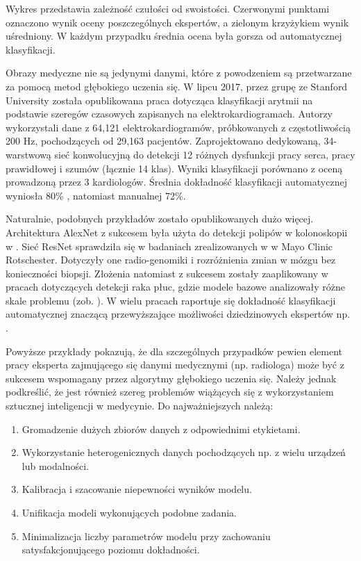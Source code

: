 Wykres przedstawia zależność czułości od swoistości. Czerwonymi punktami oznaczono wynik oceny poszczególnych ekspertów, a zielonym krzyżykiem wynik uśredniony. W każdym przypadku średnia ocena była gorsza od automatycznej klasyfikacji.

Obrazy medyczne nie są jedynymi danymi, które z powodzeniem są przetwarzane za pomocą metod głębokiego uczenia się. W lipcu 2017, przez grupę ze Stanford University została opublikowana praca \cite{2017arXiv170701836R} dotycząca klasyfikacji arytmii na podstawie szeregów czasowych zapisanych na elektrokardiogramach. Autorzy wykorzystali dane z 64,121 elektrokardiogramów, próbkowanych z częstotliwością 200 Hz, pochodzących od 29,163 pacjentów. Zaprojektowano dedykowaną, 34-warstwową sieć konwolucyjną do detekcji 12 różnych dysfunkcji pracy serca, pracy prawidłowej i szumów (łącznie 14 klas). Wyniki klasyfikacji porównano z oceną prowadzoną przez 3 kardiologów. Średnia dokładność klasyfikacji automatycznej wyniosła 80\% , natomiast manualnej 72\%.

Naturalnie, podobnych przykładów zostało opublikowanych dużo więcej. Architektura AlexNet z sukcesem była użyta do detekcji polipów w kolonoskopii w \cite{Tajbakhsh2016}. Sieć ResNet sprawdziła się w badaniach zrealizowanych w \cite{Erickson2018} w Mayo Clinic Rotschester. Dotyczyły one radio-genomiki i rozróżnienia zmian w mózgu bez konieczności biopsji. Złożenia natomiast z sukcesem zostały zaaplikowany w pracach dotyczących detekcji raka płuc, gdzie modele bazowe analizowały różne skale problemu (zob. \cite{LungChalenge}). W wielu pracach raportuje się dokładność klasyfikacji automatycznej znaczącą przewyższające możliwości dziedzinowych ekspertów np. \cite{Christiansen2018, Sarraf2016, Glasser2016, 2016arXiv160605718W}.

Powyższe przykłady pokazują, że dla szczególnych przypadków pewien element pracy eksperta zajmującego się danymi medycznymi (np. radiologa) może być z sukcesem wspomagany przez algorytmy głębokiego uczenia się. Należy jednak podkreślić, że jest również szereg problemów wiążących się z wykorzystaniem sztucznej inteligencji w medycynie. Do najważniejszych należą:
\begin{enumerate}
	\item Gromadzenie dużych zbiorów danych z odpowiednimi etykietami.
	\item Wykorzystanie heterogenicznych danych pochodzących np. z wielu urządzeń lub modalności.
	\item Kalibracja i szacowanie niepewności wyników modelu.
	\item Unifikacja modeli wykonujących podobne zadania.
	\item Minimalizacja liczby parametrów modelu przy zachowaniu satysfakcjonującego poziomu dokładności.
\end{enumerate}

